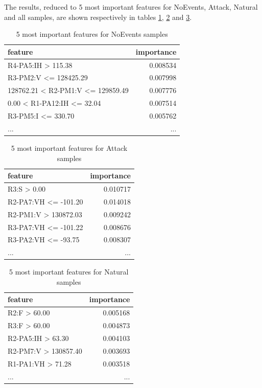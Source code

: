 The results, reduced to 5 most important features for NoEvents, Attack, Natural and all samples, are shown respectively in tables \ref{tab:5best:noev}, \ref{tab:5best:attack} and \ref{tab:5best:natural}.

\begin{table}[H]
    \centering
    \caption{5 most important features for NoEvents samples} \label{tab:5best:noev}
    \begin{tabular}{lr}\toprule
        feature  &importance\\\midrule            
        R4-PA5:IH > 115.38                  & 0.008534\\
        R3-PM2:V <= 128425.29               & 0.007998\\
        128762.21 < R2-PM1:V <= 129859.49   & 0.007776\\
        0.00 < R1-PA12:IH <= 32.04          & 0.007514\\
        R3-PM5:I <= 330.70                  & 0.005762\\
        ...                                 & ... \\\bottomrule
    \end{tabular}
\end{table}

\begin{table}[H]
    \centering
    \caption{5 most important features for Attack samples} \label{tab:5best:attack}
    \begin{tabular}{lr}\toprule
        feature                   & importance \\\midrule
        R3:S > 0.00                    & 0.010717  \\
        R2-PA7:VH <= -101.20           & 0.014018   \\
        R2-PM1:V > 130872.03           & 0.009242 \\
        R3-PA7:VH <= -101.22           & 0.008676 \\
        R3-PA2:VH <= -93.75            & 0.008307 \\
        ...                            & ... \\\bottomrule
    \end{tabular}
\end{table}

\begin{table}[H]
    \centering
    \caption{5 most important features for Natural samples} \label{tab:5best:natural}
    \begin{tabular}{lr}\toprule
        feature                & importance   \\\midrule    
        R2:F > 60.00           &  0.005168 \\
        R3:F > 60.00           &  0.004873 \\
        R2-PA5:IH > 63.30      &  0.004103 \\
        R2-PM7:V > 130857.40   &  0.003693 \\
        R1-PA1:VH > 71.28     &   0.003518 \\
        ...                    &       ...    \\\bottomrule
    \end{tabular}
\end{table}

